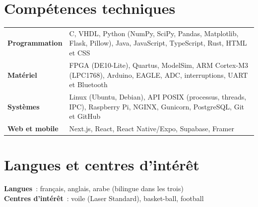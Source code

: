 \documentclass[10pt,a4paper]{article}
\begin{document}
\section*{Compétences techniques}

\begin{tabularx}{\linewidth}{@{}lX@{}}
  \textbf{Programmation} & C, VHDL, Python (NumPy, SciPy, Pandas, Matplotlib, Flask, Pillow), Java, JavaScript, TypeScript, Rust, HTML et CSS \\[2pt]
  \textbf{Matériel}      & FPGA (DE10-Lite), Quartus, ModelSim, ARM Cortex-M3 (LPC1768), Arduino, \mbox{EAGLE}, ADC, interruptions, UART et Bluetooth \\[2pt]
  \textbf{Systèmes}      & Linux (Ubuntu, Debian), API POSIX (processus, threads, IPC), Raspberry Pi, NGINX, Gunicorn, PostgreSQL, Git et GitHub \\[2pt]
  \textbf{Web et mobile} & Next.js, React, React Native/Expo, Supabase, Framer \\
\end{tabularx}

\section*{Langues et centres d'intérêt}

\textbf{Langues}~: français, anglais, arabe (bilingue dans les trois)\\
\textbf{Centres d'intérêt}~: voile (Laser Standard), basket-ball, football
\end{document}
